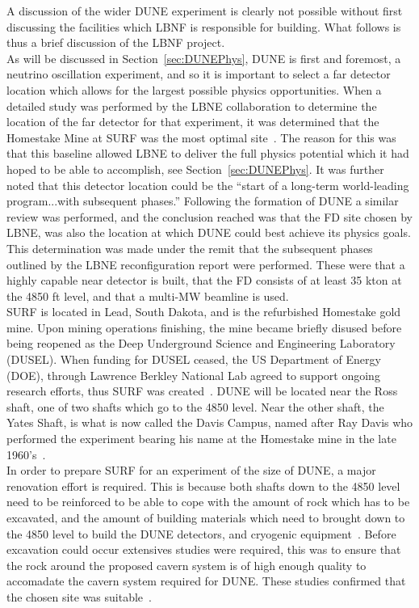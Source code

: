 A discussion of the wider DUNE experiment is clearly not possible without first discussing the facilities which LBNF is responsible for building. What follows is thus a brief discussion of the LBNF project. \\

As will be discussed in Section~\ref{sec:DUNEPhys}, DUNE is first and foremost, a neutrino oscillation experiment, and so it is important to select a far detector location which allows for the largest possible physics opportunities. When a detailed study was performed by the LBNE collaboration to determine the location of the far detector for that experiment, it was determined that the Homestake Mine at SURF was the most optimal site~\citep{LBNEReconfig}. The reason for this was that this baseline allowed LBNE to deliver the full physics potential which it had hoped to be able to accomplish, see Section~\ref{sec:DUNEPhys}. It was further noted that this detector location could be the ``start of a long-term world-leading program...with subsequent phases.'' Following the formation of DUNE a similar review was performed, and the conclusion reached was that the FD site chosen by LBNE, was also the location at which DUNE could best achieve its physics goals. This determination was made under the remit that the subsequent phases outlined by the LBNE reconfiguration report were performed. These were that a highly capable near detector is built, that the FD consists of at least 35 kton at the 4850 ft level, and that a multi-MW beamline is used. \\

SURF is located in Lead, South Dakota, and is the refurbished Homestake gold mine. Upon mining operations finishing, the mine became briefly disused before being reopened as the Deep Underground Science and Engineering Laboratory (DUSEL). When funding for DUSEL ceased, the US Department of Energy (DOE), through Lawrence Berkley National Lab agreed to support ongoing research efforts, thus SURF was created~\citep{SURFWebsite}. DUNE will be located near the Ross shaft, one of two shafts which go to the 4850 level. Near the other shaft, the Yates Shaft, is what is now called the Davis Campus, named after Ray Davis who performed the experiment bearing his name at the Homestake mine in the late 1960's~\citep{RayDavis1968, RayDavis1988}. \\

In order to prepare SURF for an experiment of the size of DUNE, a major renovation effort is required. This is because both shafts down to the 4850 level need to be reinforced to be able to cope with the amount of rock which has to be excavated, and the amount of building materials which need to brought down to the 4850 level to build the DUNE detectors, and cryogenic equipment~\citep{DUNECDR_V3}. Before excavation could occur extensives studies were required, this was to ensure that the rock around the proposed cavern system is of high enough quality to accomadate the cavern system required for DUNE. These studies confirmed that the chosen site was suitable~\citep{DUNECDR_V3}. \\

